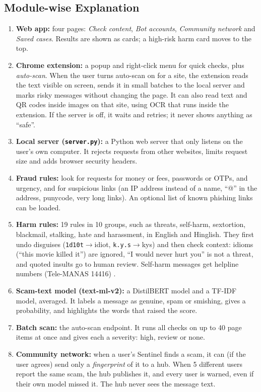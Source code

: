 \subsection{Module-wise Explanation}
\begin{enumerate}[label=\textbf{M\arabic*}, leftmargin=1.1cm]
\item \textbf{Web app:} four pages: \emph{Check content}, \emph{Bot accounts}, \emph{Community network} and \emph{Saved cases}. Results are shown as cards; a high-risk harm card moves to the top.
\item \textbf{Chrome extension:} a popup and right-click menu for quick checks, plus \emph{auto-scan}. When the user turns auto-scan on for a site, the extension reads the text visible on screen, sends it in small batches to the local server and marks risky messages without changing the page. It can also read text and QR codes inside images on that site, using OCR that runs inside the extension. If the server is off, it waits and retries; it never shows anything as ``safe''.
\item \textbf{Local server (\texttt{server.py}):} a Python web server that only listens on the user's own computer. It rejects requests from other websites, limits request size and adds browser security headers.
\item \textbf{Fraud rules:} look for requests for money or fees, passwords or OTPs, and urgency, and for suspicious links (an IP address instead of a name, ``@'' in the address, punycode, very long links). An optional list of known phishing links can be loaded.
\item \textbf{Harm rules:} 19 rules in 10 groups, such as threats, self-harm, sextortion, blackmail, stalking, hate and harassment, in English and Hinglish. They first undo disguises (\texttt{1d10t}$\to$idiot, \texttt{k.y.s}$\to$kys) and then check context: idioms (``this movie killed it'') are ignored, ``I would never hurt you'' is not a threat, and quoted insults go to human review. Self-harm messages get helpline numbers (Tele-MANAS 14416) \cite{telemanas}.
\item \textbf{Scam-text model (text-ml-v2):} a DistilBERT model and a TF-IDF model, averaged. It labels a message as genuine, spam or smishing, gives a probability, and highlights the words that raised the score.
\item \textbf{Batch scan:} the auto-scan endpoint. It runs all checks on up to 40 page items at once and gives each a severity: high, review or none.
\item \textbf{Community network:} when a user's Sentinel finds a scam, it can (if the user agrees) send only a \emph{fingerprint} of it to a hub. When 5 different users report the same scam, the hub publishes it, and every user is warned, even if their own model missed it. The hub never sees the message text.

\end{enumerate}
